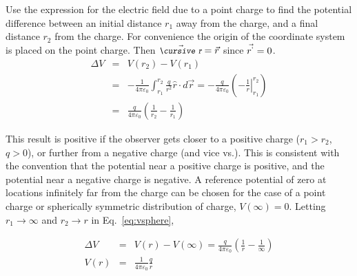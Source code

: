 \documentclass[12pt]{article}
\begin{document}
\begin{flushleft}
Use the expression for the electric field due to a point charge to find the potential difference between an initial distance $r_{1}$ away from the charge, and a final distance $r_{2}$ from the charge.  For convenience the origin of the coordinate system is placed on the point charge.  Then $\vec{\text{\small\slshape\cursive r}}=\vec{r}$ since $\vec{r^{`}}=0$.
\begin{eqnarray}
\Delta V & = & V(r_{2}) - V(r_{1}) \nonumber \\
& = & - \frac{1}{4\pi \varepsilon_{0}}\int_{r_{1}}^{r_{2}}  \frac{q}{r^{2}} \hat{r} \cdot  d\vec{r} 
   = - \frac{q}{4\pi \varepsilon_{0}} \left( \left. -\frac{1}{r} \right\vert_{r_{1}}^{r_{2}} \right)  \nonumber \\
   & = &  \frac{q}{4\pi \varepsilon_{0}} \left(\frac{1}{r_{2}}-\frac{1}{r_{1}} \right) 
\label{eq:vsphere}
\end{eqnarray}

This result is positive if the observer gets closer to a positive charge ($r_{1} > r_{2}$, $q > 0$), or further from a negative charge (and vice vs.).  This is consistent with the convention that the potential near a positive charge is positive, and the potential near a negative charge is negative.  A reference potential of zero at locations infinitely far from the charge can be chosen for the case of a point charge or spherically symmetric distribution of charge, $V(\infty)=0$.  Letting $r_{1}\rightarrow \infty$ and $r_{2}\rightarrow r$ in  Eq.~\ref{eq:vsphere},

\begin{eqnarray*}
\Delta V & = & V(r) - V(\infty) = \frac{q}{4\pi \varepsilon_{0}} \left(\frac{1}{r}-\frac{1}{\infty} \right) \\
V(r)  & = &  \frac{1}{4\pi \varepsilon_{0}}\frac{q}{r}
\end{eqnarray*}


\end{flushleft}
\end{document}
